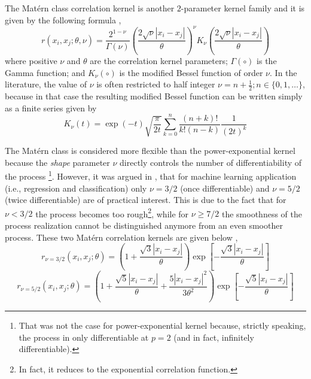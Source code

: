 The Mat\'ern class correlation kernel is another $2$-parameter kernel family and it is given by the following formula \cite{Santner2003,Rasmussen2006},
\begin{equation}
	r(x_i, x_j; \theta, \nu) = \frac{2^{1-\nu}}{\Gamma(\nu)} \left(\frac{2\sqrt{\nu} |x_i - x_j|}{\theta}\right)^\nu K_{\nu}\left(\frac{2\sqrt{\nu} |x_i - x_j|}{\theta}\right)
\label{eq:matern_kernel}
\end{equation}
where positive $\nu$ and $\theta$ are the correlation kernel parameters;
$\Gamma(\circ)$ is the Gamma function;
and $K_\nu (\circ)$ is the modified Bessel function of order $\nu$.
In the literature, the value of $\nu$ is often restricted to half integer $\nu = n + \frac{1}{2}; n \in \{0,1,\ldots\}$,
because in that case the resulting modified Bessel function can be written simply as a finite series given by
\begin{equation}
	K_\nu(t) = \exp{(-t)} \sqrt{\frac{\pi}{2t}} \sum_{k = 0}^{n} \frac{(n+k)!}{k! (n-k)} \frac{1}{(2t)^k}
\label{eq:modified_bessel}
\end{equation}

The Mat\'ern class is considered more flexible than the power-expo\-nential kernel because the \emph{shape} parameter $\nu$ directly controls the number of differentiability of the process \cite{Stein1989}\footnote{That was not the case for power-exponential kernel because, strictly speaking, the process in only differentiable at $p = 2$ (and in fact, infinitely differentiable).}.
However, it was argued in \cite{Rasmussen2006}, that for machine learning application (i.e., regression and classification) only $\nu = 3/2$ (once differentiable) and $\nu = 5/2$ (twice differentiable) are of practical interest.
This is due to the fact that for $\nu < 3/2$ the process becomes too rough\footnote{In fact, it reduces to the exponential correlation function.},
while for $\nu \geq 7/2$ the smoothness of the process realization cannot be distinguished anymore from an even smoother process.
These two Mat\'ern correlation kernels are given below \cite{Roustant2012,Rasmussen2006},
\begin{equation}
	r_{\nu=3/2}(x_i, x_j;\theta) = \left(1 + \frac{\sqrt{3}|x_i - x_j|}{\theta}\right) \exp{\left[-\frac{\sqrt{3} |x_i - x_j|}{\theta}\right]}
\label{eq:matern3_2}
\end{equation}
\begin{equation}
	r_{\nu=5/2}(x_i, x_j;\theta) = \left(1 + \frac{\sqrt{5}|x_i - x_j|}{\theta} + \frac{5|x_i - x_j|^2}{3\theta^2}\right) \exp{\left[-\frac{\sqrt{5} |x_i - x_j|}{\theta}\right]}
\label{eq:matern5_2}
\end{equation}

